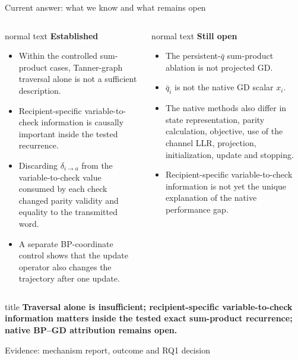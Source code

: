 \documentclass[aspectratio=169,9pt,t]{beamer}
\newcommand{\evidence}[1]{%
  \vfill\hfill{\fontsize{5.8}{6.8}\selectfont\color{Muted}Evidence: #1}}
\newcommand{\takeaway}[1]{%
  \begin{beamercolorbox}[rounded=true,sep=1.5ex]{title}
    \centering\normalsize\bfseries #1
  \end{beamercolorbox}}
\begin{document}
\begin{frame}{Current answer: what we know and what remains open}
  \begin{columns}[T,onlytextwidth]
    \begin{beamercolorbox}[rounded=true,sep=1.2ex]{normal text}
      \small
      \textcolor{Good}{\large\bfseries Established}
      \begin{itemize}
        \item Within the controlled sum-product cases, Tanner-graph traversal alone is not a sufficient description.
        \item Recipient-specific variable-to-check information is causally important inside the tested recurrence.
        \item Discarding $\delta_{i\to a}$ from the variable-to-check value consumed by each check changed parity validity and equality to the transmitted word.
        \item A separate BP-coordinate control shows that the update operator also changes the trajectory after one update.
      \end{itemize}
    \end{beamercolorbox}

    \begin{beamercolorbox}[rounded=true,sep=1.2ex]{normal text}
      \small
      \textcolor{Bad}{\large\bfseries Still open}
      \begin{itemize}
        \item The persistent-$\bar q$ sum-product ablation is not projected GD.
        \item $\bar q_i$ is not the native GD scalar $x_i$.
        \item The native methods also differ in state representation, parity calculation, objective, use of the channel LLR, projection, initialization, update and stopping.
        \item Recipient-specific variable-to-check information is not yet the unique explanation of the native performance gap.
      \end{itemize}
    \end{beamercolorbox}
  \end{columns}

  \vspace{2mm}
  \takeaway{Traversal alone is insufficient; recipient-specific variable-to-check information matters inside the tested exact sum-product recurrence; native BP--GD attribution remains open.}
  \evidence{mechanism report, outcome and RQ1 decision}
\end{frame}
\end{document}
